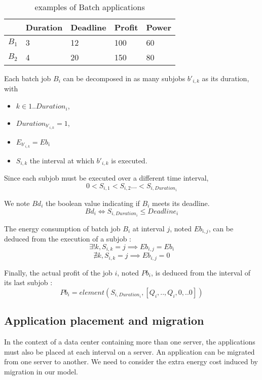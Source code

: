 \documentclass[a4paper]{article}
\begin{document}
\begin{table}[H]
\begin{center}
  \begin{tabular}{ | l | l | l | l | l |}
     \hline
          & Duration & Deadline & Profit & Power \\ \hline
    $B_1$ & 3 & 12 & 100 & 60 \\ \hline
    $B_2$ & 4 & 20 & 150 & 80 \\
    \hline
    \end{tabular}
\end{center}
\caption{examples of Batch applications}
\end{table}

Each batch job $B_i$ can be decomposed in as many subjobs $b'_{i,k}$ as its duration, with
\begin{itemize}
\item $k\in1..Duration_i$, 
\item $Duration_{b'_{i,k}} = 1$,
\item $E_{b'_{i,k}} = Eb_i$
\item $S_{i,k}$ the interval at which $b'_{i,k}$ is executed.
\end{itemize}

Since each subjob must be executed over a different time interval,
\[0 < S_{i,1} < S_{i,2}... < S_{i,Duration_i}\]

We note $Bd_i$ the boolean value indicating if $B_i$ meets its deadline.
\[Bd_i \iff S_{i,Duration_i} \leq Deadline_i\]

The energy consumption of batch job $B_i$ at interval $j$, noted $Eb_{i,j}$, can be deduced from the execution of a subjob :
\[\exists! k, S_{i,k} = j \implies Eb_{i,j} = Eb_i\]
\[\nexists k, S_{i,k} = j \implies Eb_{i,j} = 0\]

Finally, the actual profit of the job $i$, noted $Pb_i$, is deduced from the interval of its last subjob :
\[Pb_i = element (S_{i,Duration_i} , [Q_i,..,Q_i,0,..0])\]
 

\subsection{Application placement and migration}

In the context of a data center containing more than one server, the applications must also be placed at each interval on a server.
An application can be migrated from one server to another. We need to consider the extra energy cost induced by migration in our model.
\end{document}
